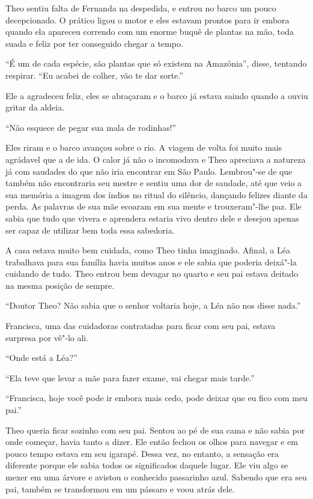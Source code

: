 Theo sentiu falta de Fernanda na despedida, e entrou no barco um pouco
decepcionado. O prático ligou o motor e eles estavam prontos para ir
embora quando ela apareceu correndo com um enorme buquê de plantas na
mão, toda suada e feliz por ter conseguido chegar a tempo.

``É um de cada espécie, são plantas que só existem na Amazônia'', disse,
tentando respirar. ``Eu acabei de colher, vão te dar sorte.''

Ele a agradeceu feliz, eles se abraçaram e o barco já estava saindo
quando a ouviu gritar da aldeia.

``Não esquece de pegar sua mala de rodinhas!''

Eles riram e o barco avançou sobre o rio. A viagem de volta foi muito
mais agrádavel que a de ida. O calor já não o incomodava e Theo
apreciava a natureza já com saudades do que não iria encontrar em São
Paulo. Lembrou"-se de que também não encontraria seu mestre e sentiu uma
dor de saudade, até que veio a sua memória a imagem dos índios no ritual
do silêncio, dançando felizes diante da perda. As palavras de sua mãe
ecoaram em sua mente e trouxeram"-lhe paz. Ele sabia que tudo que
vivera e aprendera estaria vivo dentro dele e desejou apenas ser capaz
de utilizar bem toda essa sabedoria.

\asterisc



A casa estava muito bem cuidada, como Theo tinha imaginado. Afinal, a Léa
trabalhava para sua família havia muitos anos e ele sabia que poderia
deixá"-la cuidando de tudo. Theo entrou bem devagar no quarto e
seu pai estava deitado na mesma posição de sempre.

``Doutor Theo? Não sabia que o senhor voltaria hoje, a Léa não nos disse
nada.''

Francisca, uma das cuidadoras contratadas para ficar com seu pai, estava
surpresa por vê"-lo ali.

``Onde está a Léa?''

``Ela teve que levar a mãe para fazer exame, vai chegar mais tarde.''

``Francisca, hoje você pode ir embora mais cedo, pode deixar que eu fico
com meu pai.''

Theo queria ficar sozinho com seu pai. Sentou ao pé de sua cama e não
sabia por onde começar, havia tanto a dizer. Ele então fechou os olhos
para navegar e em pouco tempo estava em seu igarapé. Dessa vez, no
entanto, a sensação era diferente porque ele sabia todos os significados
daquele lugar. Ele viu algo se mexer em uma árvore e avistou o conhecido
passarinho azul. Sabendo que era seu pai, também se transformou em um
pássaro e voou atrás dele.

